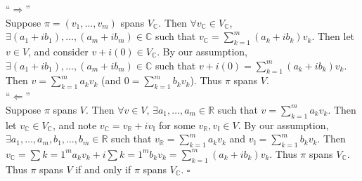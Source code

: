\documentclass[12pt]{article}
\begin{document}
\noindent ``$\Longrightarrow$'' \\
Suppose $\pi = (v_1, \dots, v_m)$ spans $V_{\mathbb{C}}$.  Then $\forall v_{\mathbb{C}} \in V_{\mathbb{C}}$, $\exists (a_1 + ib_1), \dots, (a_m + ib_m) \in \mathbb{C}$ such that $v_{\mathbb{C}} = \sum_{k = 1}^m(a_k + ib_k)v_k$. Then let $v \in V$, and consider $v + i(0) \in V_{\mathbb{C}}$.  By our assumption, $\exists (a_1 + ib_1), \dots, (a_m + ib_m) \in \mathbb{C}$ such that $v + i(0) = \sum_{k = 1}^m(a_k + ib_k)v_k$.  Then $v = \sum_{k = 1}^ma_kv_k$ (and $0 = \sum_{k = 1}^mb_kv_k$).  Thus $\pi$ spans $V$. \\

\noindent ``$\Longleftarrow$'' \\
Suppose $\pi$ spans $V$.  Then $\forall v \in V$, $\exists a_1, \dots, a_m \in \mathbb{R}$ such that $v = \sum_{k = 1}^ma_kv_k$. Then let $v_{\mathbb{C}} \in V_{\mathbb{C}}$, and note $v_{\mathbb{C}} = v_{\mathbb{R}} + iv_{\mathbb{I}}$ for some $v_{\mathbb{R}}, v_{\mathbb{I}} \in V$.  By our assumption, $\exists a_1, \dots, a_m, b_1, \dots, b_m \in \mathbb{R}$ such that $v_{\mathbb{R}} = \sum_{k = 1}^ma_kv_k$ and $v_{\mathbb{I}} = \sum_{k = 1}^mb_kv_k$.  Then $v_{\mathbb{C}} = \sum{k = 1}^ma_kv_k + i\sum{k = 1}^mb_kv_k = \sum_{k = 1}^m(a_k + ib_k)v_k$.  Thus $\pi$ spans $V_{\mathbb{C}}$. \\

\noindent Thus $\pi$ spans $V$ if and only if $\pi$ spans $V_{\mathbb{C}}$. \hfill $\square$
\end{document}
